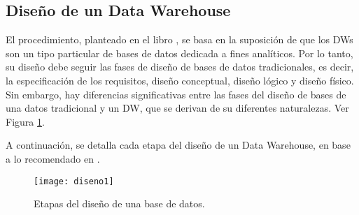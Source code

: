 \documentclass[a4paper,11pt]{article}
\begin{document}
    \subsection{Diseño de un Data Warehouse}
    
    El procedimiento, planteado en el libro \cite{VaismanZimanyi14}, se basa en la suposición de que los DWs son un tipo particular de bases de datos dedicada
    a fines analíticos.
    Por lo tanto, su diseño debe seguir las fases de diseño de bases de datos tradicionales, es decir, la especificación de los requisitos, diseño conceptual, diseño 
    lógico y diseño físico. Sin embargo, hay diferencias significativas entre las fases del diseño de bases de una datos tradicional y un DW, que se derivan de su
    diferentes naturalezas. Ver Figura \ref{etapasDiseño}.
    
    A continuación, se detalla cada etapa del diseño de un Data Warehouse, en base a lo recomendado en \cite{VaismanZimanyi14}.
    
    \begin{figure}
      \texttt{[image: diseno1]}  
      \caption{Etapas del diseño de una base de datos.}
      \label{etapasDiseño}
    \end{figure}
    
\end{document}
